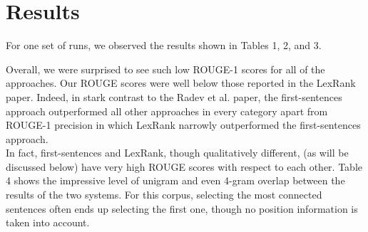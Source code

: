 \documentclass[11pt]{article}
\begin{document}
\section{Results}

For one set of runs, we observed the results shown in Tables 1, 2, and 3.

Overall, we were surprised to see such low ROUGE-1 scores for all of the approaches. Our ROUGE scores were well below those reported in the LexRank paper. Indeed, in stark contrast to the Radev et al. paper, the first-sentences approach outperformed all other approaches in every category apart from ROUGE-1 precision in which LexRank narrowly outperformed the first-sentences approach.\\
In fact, first-sentences and LexRank, though qualitatively different, (as will be discussed below) have very high ROUGE scores with respect to each other. Table 4 shows the impressive level of unigram and even 4-gram overlap between the results of the two systems. For this corpus, selecting the most connected sentences often ends up selecting the first one, though no position information is taken into account.   
\end{document}
